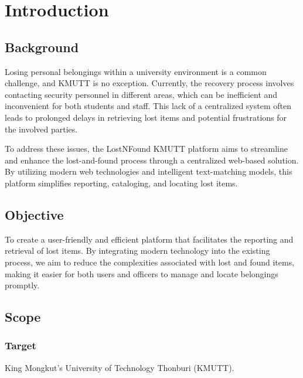 \chapter{Introduction}

\section{Background}
Losing personal belongings within a university environment is a common challenge, and KMUTT is no exception. Currently, the recovery process involves contacting security personnel in different areas, which can be inefficient and inconvenient for both students and staff. This lack of a centralized system often leads to prolonged delays in retrieving lost items and potential frustrations for the involved parties.

To address these issues, the LostNFound KMUTT platform aims to streamline and enhance the lost-and-found process through a centralized web-based solution. By utilizing modern web technologies and intelligent text-matching models, this platform simplifies reporting, cataloging, and locating lost items.

\section{Objective}
To create a user-friendly and efficient platform that facilitates the reporting and retrieval of lost items. By integrating modern technology into the existing process, we aim to reduce the complexities associated with lost and found items, making it easier for both users and officers to manage and locate belongings promptly.

\section{Scope}
\subsection{Target}
King Mongkut's University of Technology Thonburi (KMUTT).

